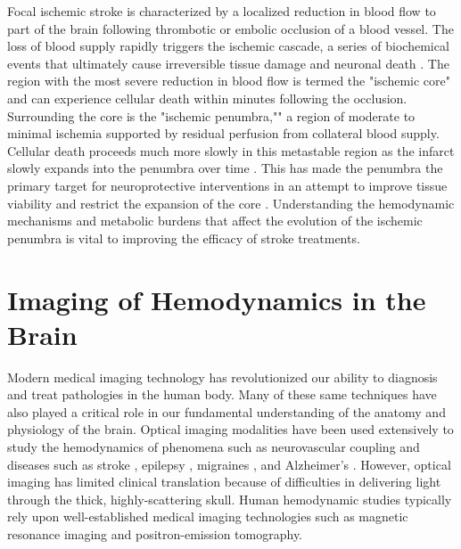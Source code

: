 Focal ischemic stroke is characterized by a localized reduction in blood flow to part of the brain following thrombotic or embolic occlusion of a blood vessel. The loss of blood supply rapidly triggers the ischemic cascade, a series of biochemical events that ultimately cause irreversible tissue damage and neuronal death \cite{Nesto:1987dx}. The region with the most severe reduction in blood flow is termed the "ischemic core" and can experience cellular death within minutes following the occlusion. Surrounding the core is the "ischemic penumbra,"" a region of moderate to minimal ischemia supported by residual perfusion from collateral blood supply. Cellular death proceeds much more slowly in this metastable region as the infarct slowly expands into the penumbra over time \cite{Heiss:1992ge, Ginsberg:1999jy}. This has made the penumbra the primary target for neuroprotective interventions in an attempt to improve tissue viability and restrict the expansion of the core \cite{Felberg:2000gu, RamosCabrer:2011gz}. Understanding the hemodynamic mechanisms and metabolic burdens that affect the evolution of the ischemic penumbra is vital to improving the efficacy of stroke treatments.



\section{Imaging of Hemodynamics in the Brain}

Modern medical imaging technology has revolutionized our ability to diagnosis and treat pathologies in the human body. Many of these same techniques have also played a critical role in our fundamental understanding of the anatomy and physiology of the brain. Optical imaging modalities have been used extensively \cite{Hillman:2007ep} to study the hemodynamics of phenomena such as neurovascular coupling \cite{Liao:2013jl} and diseases such as stroke \cite{Obrig:2011hy}, epilepsy \cite{Bahar:2006es}, migraines \cite{Bolay:2002jg}, and Alzheimer's \cite{KoronyoHamaoui:2011hk}. However, optical imaging has limited clinical translation because of difficulties in delivering light through the thick, highly-scattering skull. Human hemodynamic studies typically rely upon well-established medical imaging technologies such as magnetic resonance imaging and positron-emission tomography.

